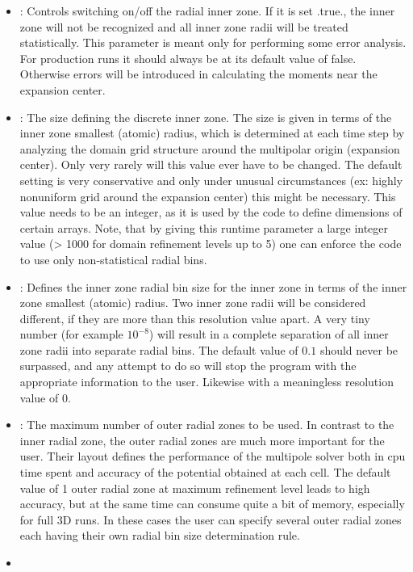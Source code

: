 \begin{itemize}
\item
{}: Controls switching on/off the radial inner zone.
If it is set .true., the inner zone will not be recognized and all inner zone
radii will be treated statistically. This parameter is meant only for performing
some error analysis. For production runs it should always be at its default value
of false. Otherwise errors will be introduced in calculating the moments near
the expansion center.
\item
{}: The size defining the discrete inner zone. The size
is given in terms of the inner zone smallest (atomic) radius, which is determined
at each time step by analyzing the domain grid structure around the multipolar origin
(expansion center). Only very rarely will this value ever have to be changed. The
default setting is very conservative and only under unusual circumstances
(ex: highly nonuniform grid around the expansion center) this might be necessary.
This value needs to be an integer, as it is used by the code to define dimensions
of certain arrays. Note, that by giving this runtime parameter a large integer
value (> 1000 for domain refinement levels up to 5) one can enforce the code to use
only non-statistical radial bins.
\item
{}: Defines the inner zone radial bin size for the
inner zone in terms of the inner zone smallest (atomic) radius.
Two inner zone radii will be considered different, if they are more than this
resolution value apart. A very tiny number (for example $10^{-8}$) will result in a complete
separation of all inner zone radii into separate radial bins. The default
value of $0.1$ should never be surpassed, and any attempt to do so will stop the
program with the appropriate information to the user. Likewise with a meaningless
resolution value of 0.
\item
{}: The maximum number of outer radial zones to be used.
In contrast to the inner radial zone, the outer radial zones are much more important
for the user. Their layout defines the performance of the multipole solver both
in cpu time spent and accuracy of the potential obtained at each cell. The
default value of 1 outer radial zone at maximum refinement level leads to high
accuracy, but at the same time can consume quite a bit of memory, especially for full
3D runs. In these cases the user can specify several outer radial zones
each having their own radial bin size determination rule.
\item

\end{itemize}
